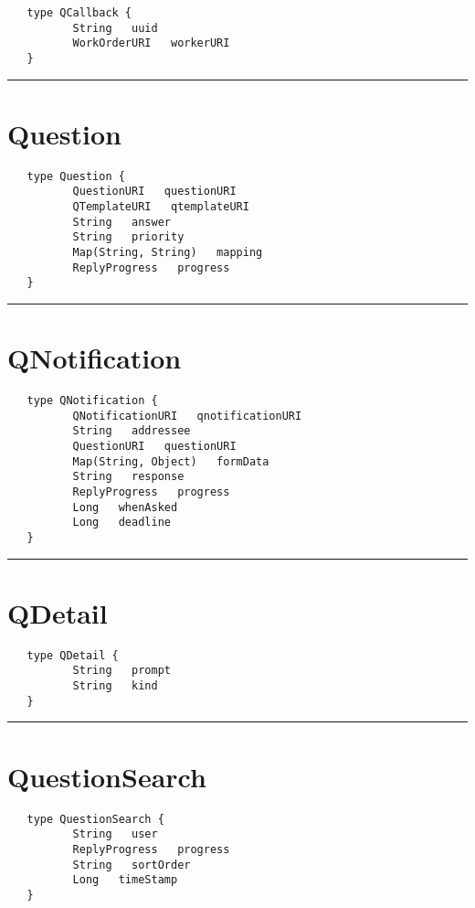 \begin{verbatim}
   type QCallback {
          String   uuid
          WorkOrderURI   workerURI
   }
\end{verbatim}

\rule{15cm}{2pt}
\section{Question}
\label{type:Question}

\begin{verbatim}
   type Question {
          QuestionURI   questionURI
          QTemplateURI   qtemplateURI
          String   answer
          String   priority
          Map(String, String)   mapping
          ReplyProgress   progress
   }
\end{verbatim}

\rule{15cm}{2pt}
\section{QNotification}
\label{type:QNotification}

\begin{verbatim}
   type QNotification {
          QNotificationURI   qnotificationURI
          String   addressee
          QuestionURI   questionURI
          Map(String, Object)   formData
          String   response
          ReplyProgress   progress
          Long   whenAsked
          Long   deadline
   }
\end{verbatim}

\rule{15cm}{2pt}
\section{QDetail}
\label{type:QDetail}

\begin{verbatim}
   type QDetail {
          String   prompt
          String   kind
   }
\end{verbatim}

\rule{15cm}{2pt}
\section{QuestionSearch}
\label{type:QuestionSearch}

\begin{verbatim}
   type QuestionSearch {
          String   user
          ReplyProgress   progress
          String   sortOrder
          Long   timeStamp
   }
\end{verbatim}

